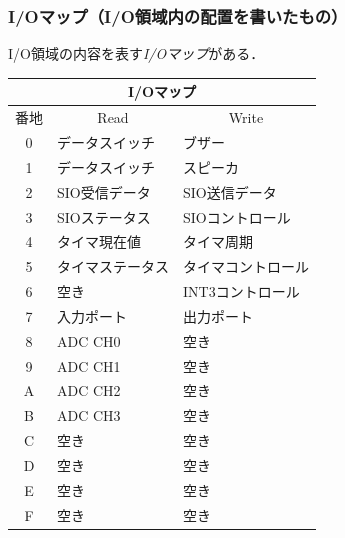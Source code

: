 \documentclass{beamer}                 %
\begin{document}
\begin{frame}
  \frametitle{I/Oマップ（I/O領域内の配置を書いたもの）}
  I/O領域の内容を表す\emph{I/Oマップ}がある．
  \vfill
    \footnotesize\begin{tabular}{| c | l | l |}
    \hline
    \multicolumn{3}{|c|}{I/Oマップ} \\
    \hline
    番地 & \multicolumn{1}{|c|}{Read} & \multicolumn{1}{|c|}{Write} \\
    \hline
    0 & データスイッチ   & ブザー \\
    1 & データスイッチ   & スピーカ \\
    2 & SIO受信データ    & SIO送信データ \\
    3 & SIOステータス    & SIOコントロール \\
    4 & タイマ現在値     & タイマ周期 \\
    5 & タイマステータス & タイマコントロール \\
    6 & 空き             & INT3コントロール \\
    7 & 入力ポート       & 出力ポート \\
    8 & ADC CH0          & 空き \\
    9 & ADC CH1          & 空き \\
    A & ADC CH2          & 空き \\
    B & ADC CH3          & 空き \\
    C & 空き             & 空き \\
    D & 空き             & 空き \\
    E & 空き             & 空き \\
    F & 空き             & 空き \\
    \hline
    \end{tabular}
  \vfill
  \vfill
\end{frame}
\end{document}
